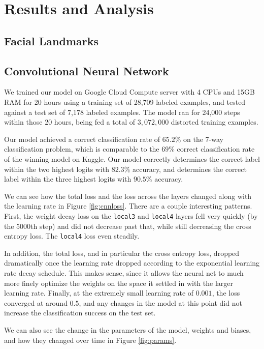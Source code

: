 \documentclass[11pt, twocolumn, twoside]{article}
\begin{document}
\section{Results and Analysis}

\subsection{Facial Landmarks}

\subsection{Convolutional Neural Network}

We trained our model on Google Cloud Compute server with 4 CPUs and 15GB RAM for 20 hours using a training set of 28,709 labeled examples, and tested against a test set of 7,178 labeled examples. The model ran for 24,000 steps within those 20 hours, being fed a total of $3,072,000$ distorted training examples.

Our model achieved a correct classification rate of $65.2\%$ on the 7-way classification problem, which is comparable to the $69\%$ correct classification rate of the winning model on Kaggle. Our model correctly determines the correct label within the two highest logits with $82.3\%$ accuracy, and determines the correct label within the three highest logits with $90.5\%$ accuracy.

We can see how the total loss and the loss across the layers changed along with the learning rate in Figure \ref{fig:cnnloss}. There are a couple interesting patterns. First, the weight decay loss on the \texttt{local3} and \texttt{local4} layers fell very quickly (by the 5000th step) and did not decrease past that, while still decreasing the cross entropy loss. The \texttt{local4} loss even steadily. 

In addition, the total loss, and in particular the cross entropy loss, dropped dramatically once the learning rate dropped according to the exponential learning rate decay schedule. This makes sense, since it allows the neural net to much more finely optimize the weights on the space it settled in with the larger learning rate. Finally, at the extremely small learning rate of $0.001$, the loss converged at around $0.5$, and any changes in the model at this point did not increase the classification success on the test set.

We can also see the change in the parameters of the model, weights and biases, and how they changed over time in Figure \ref{fig:params}.
\end{document}

